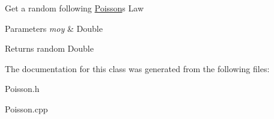 Get a random following \hyperlink{classPoisson}{Poisson}\textquotesingle{}s Law 
\begin{DoxyParams}{Parameters}
{\em moy} & Double \\
\hline
\end{DoxyParams}
\begin{DoxyReturn}{Returns}
random Double 
\end{DoxyReturn}


The documentation for this class was generated from the following files\+:\begin{DoxyCompactItemize}
\item 
Poisson.\+h\item 
Poisson.\+cpp\end{DoxyCompactItemize}
